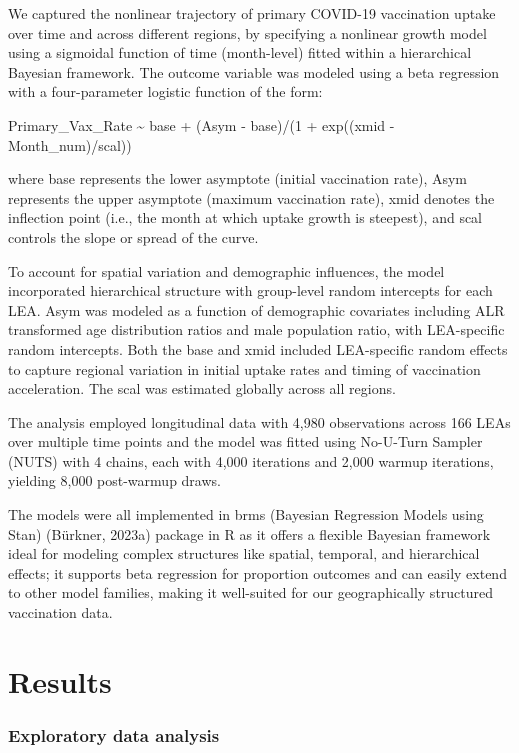 \documentclass{article}
\begin{document}
We captured the nonlinear trajectory of primary COVID-19 vaccination
uptake over time and across different regions, by specifying a nonlinear
growth model using a sigmoidal function of time (month-level) fitted
within a hierarchical Bayesian framework. The outcome variable was
modeled using a beta regression with a four-parameter logistic function
of the form:

Primary\_Vax\_Rate \textasciitilde{} base + (Asym - base)/(1 + exp((xmid
- Month\_num)/scal))

where base represents the lower asymptote (initial vaccination rate),
Asym represents the upper asymptote (maximum vaccination rate), xmid
denotes the inflection point (i.e., the month at which uptake growth is
steepest), and scal controls the slope or spread of the curve.

To account for spatial variation and demographic influences, the model
incorporated hierarchical structure with group-level random intercepts
for each LEA. Asym was modeled as a function of demographic covariates
including ALR transformed age distribution ratios and male population
ratio, with LEA-specific random intercepts. Both the base and xmid
included LEA-specific random effects to capture regional variation in
initial uptake rates and timing of vaccination acceleration. The scal
was estimated globally across all regions.

The analysis employed longitudinal data with 4,980 observations across
166 LEAs over multiple time points and the model was fitted using
No-U-Turn Sampler (NUTS) with 4 chains, each with 4,000 iterations and
2,000 warmup iterations, yielding 8,000 post-warmup draws.

The models were all implemented in brms (Bayesian Regression Models
using Stan) (Bürkner, 2023a) package in R as it offers a flexible
Bayesian framework ideal for modeling complex structures like spatial,
temporal, and hierarchical effects; it supports beta regression for
proportion outcomes and can easily extend to other model families,
making it well-suited for our geographically structured vaccination
data.

\section{Results}\label{results}

\subsubsection{Exploratory data
analysis}\label{exploratory-data-analysis}
\end{document}
